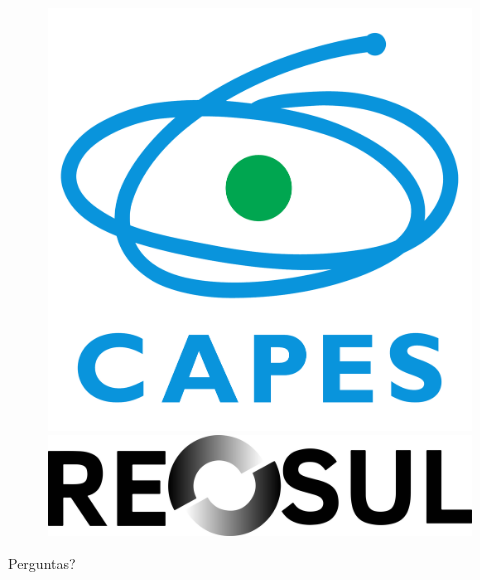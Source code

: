 \documentclass[aspectratio=169]{beamer}
\begin{document}
\begin{frame}
\begin{figure}
\begin{minipage}[c][0.2\textheight][c]{0.24\textwidth}
            \includegraphics[height=0.16\textheight]{images/logos/capes.pdf}
        \end{minipage}
        \hfill
        \begin{minipage}[c][0.2\textheight][c]{0.24\textwidth}
            \centering
            \includegraphics[height=0.10\textheight]{images/logos/reosul.png}
        \end{minipage}
    \end{figure}
\end{frame}







% 









\begin{frame}[allowframebreaks]
    \printbibliography
\end{frame}

\begin{frame}
    \begin{center}
        {\Huge Perguntas?}
    \end{center}
\end{frame}
\end{document}
